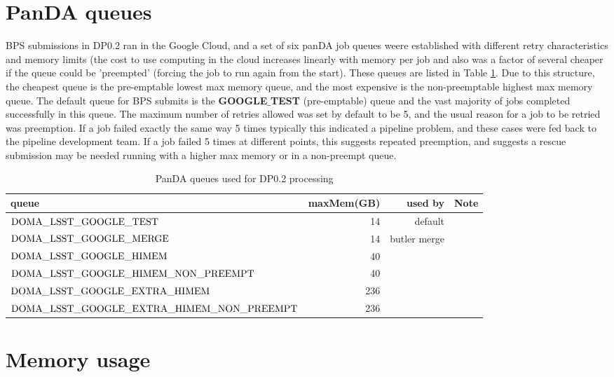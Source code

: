 \documentclass[OPS,authoryear,toc]{lsstdoc}
\begin{document}
\section{PanDA queues}
BPS submissions in DP0.2 ran in the Google Cloud, and a set of six panDA job 
queues weere established with different retry characteristics and 
memory limits (the cost to use computing in the cloud increases 
linearly with memory per job and also was a factor of 
several cheaper if the queue could be 'preempted' (forcing the job 
to run again from the start).  
These queues are listed in Table \ref{tab:queues}. Due to this 
structure, the cheapest queue is the pre-emptable lowest max 
memory queue, and the most expensive is the 
non-preemptable highest max memory queue. The default queue for BPS submits 
is the {\bf GOOGLE$\_$TEST} (pre-emptable) queue and the vast majority 
of jobs completed successfully in this queue.  The maximum number of
retries allowed was set by default to be 5, and the usual reason for a 
job to be retried was preemption.  If a job failed exactly the same 
way 5 times typically this indicated a pipeline problem, 
and these cases were fed back to the pipeline development team. 
If a job failed 5 times at different points, this suggests repeated
preemption, and suggests a rescue submission may be needed running with
a higher max memory or in a non-preempt queue.

\begin{center}
\begin{table}[ht]
\caption{PanDA queues used for DP0.2 processing}
\begin{tabular} { |l|r|r|l|}
\hline
queue & maxMem(GB) & used by &  Note\\
\hline
$\rm DOMA\_LSST\_GOOGLE\_TEST$ & 14 & default &\\
$\rm DOMA\_LSST\_GOOGLE\_MERGE$ & 14 & butler merge &\\
$\rm DOMA\_LSST\_GOOGLE\_HIMEM$ & 40 &  &\\
$\rm DOMA\_LSST\_GOOGLE\_HIMEM\_NON\_PREEMPT$ & 40 & &\\
$\rm DOMA\_LSST\_GOOGLE\_EXTRA\_HIMEM$ & 236 &  &\\
$\rm DOMA\_LSST\_GOOGLE\_EXTRA\_HIMEM\_NON\_PREEMPT$ & 236 & &\\
\hline
\end{tabular}
\label{tab:queues}
\end{table}
\end{center}


\section{Memory usage}
\end{document}
